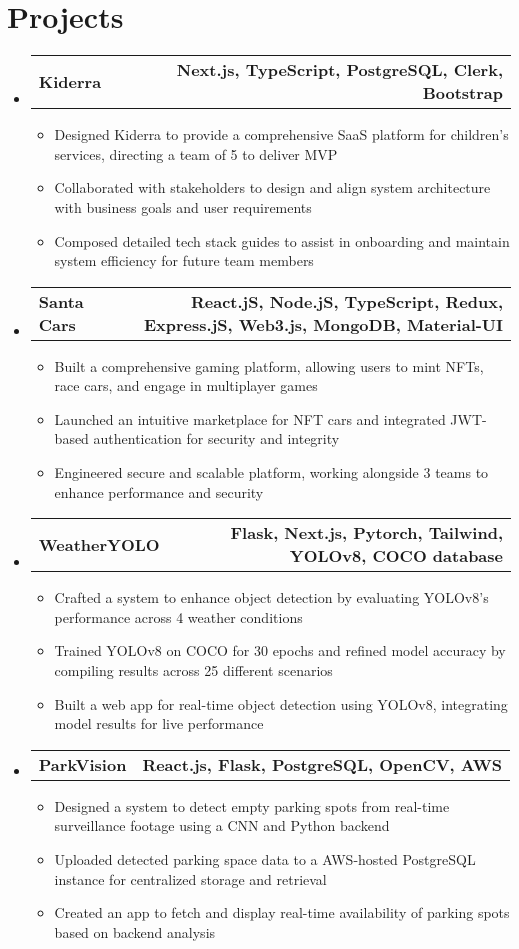 \documentclass[letterpaper,11pt]{article}
\makeatletter
\newcommand{\resumeItem}[1]{
  \item\small{
    {#1 \vspace{-2pt}}
  }
}
\newcommand{\resumeProjectHeading}[2]{
    \item
    \begin{tabular*}{1.001\textwidth}{l@{\extracolsep{\fill}}r}
      \small#1 & \textbf{\small #2}\\
    \end{tabular*}\vspace{-7pt}
}
\newcommand{\resumeSubHeadingListStart}{\begin{itemize}[leftmargin=0.0in, label={}]}
\newcommand{\resumeSubHeadingListEnd}{\end{itemize}}
\newcommand{\resumeItemListStart}{\begin{itemize}}
\newcommand{\resumeItemListEnd}{\end{itemize}\vspace{-5pt}}
\makeatother
\begin{document}
\section{Projects}
\vspace{-6pt}
\resumeSubHeadingListStart
    \resumeProjectHeading
        {\textbf{Kiderra}  \emph{}}{Next.js, TypeScript, PostgreSQL, Clerk, Bootstrap}
        \resumeItemListStart
        \resumeItem{Designed Kiderra to provide a comprehensive SaaS platform for children's services, directing a team of 5 to deliver MVP}
        \resumeItem{Collaborated with stakeholders to design and align system architecture with business goals and user requirements}
        \resumeItem{Composed detailed tech stack guides to assist in onboarding and maintain system efficiency for future team members}
        \resumeItemListEnd
        \vspace{-16pt}
    \resumeProjectHeading
        {\textbf{Santa Cars}  \emph{}}{React.jS, Node.jS, TypeScript, Redux, Express.jS, Web3.js, MongoDB, Material-UI}
        \resumeItemListStart
          \resumeItem{Built a comprehensive gaming platform, allowing users to mint NFTs, race cars, and engage in multiplayer games}
          \resumeItem{Launched an intuitive marketplace for NFT cars and integrated JWT-based authentication for security and integrity}
          \resumeItem{Engineered secure and scalable platform, working alongside 3 teams to enhance performance and security}
        \resumeItemListEnd
        \vspace{-16pt}
    \resumeProjectHeading
        {\textbf{WeatherYOLO}  \emph{}}{Flask, Next.js, Pytorch, Tailwind, YOLOv8, COCO database}
        \resumeItemListStart
          \resumeItem{Crafted a system to enhance object detection by evaluating YOLOv8’s performance across 4 weather conditions}
          \resumeItem{Trained YOLOv8 on COCO for 30 epochs and refined model accuracy by compiling results across 25 different scenarios}
          \resumeItem{Built a web app for real-time object detection using YOLOv8, integrating model results for live performance}
        \resumeItemListEnd
        \vspace{-16pt}
    \resumeProjectHeading
        {\textbf{ParkVision}  \emph{}}{React.js, Flask, PostgreSQL, OpenCV, AWS}
        \resumeItemListStart
          \resumeItem{Designed a system to detect empty parking spots from real-time surveillance footage using a CNN and Python backend}
          \resumeItem{Uploaded detected parking space data to a AWS-hosted PostgreSQL instance for centralized storage and retrieval}
          \resumeItem{Created an app to fetch and display real-time availability of parking spots based on backend analysis}
        \resumeItemListEnd
  \resumeSubHeadingListEnd
\vspace{-15pt}
\end{document}
